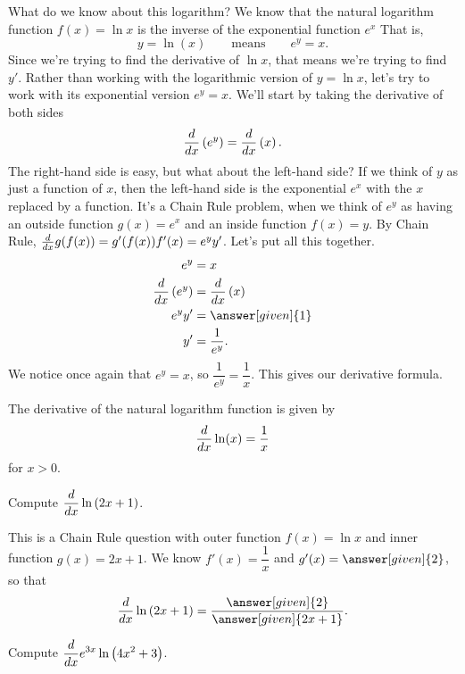 \documentclass{ximera}
\begin{document}
What do we know about this logarithm?  We know that the natural logarithm function $f(x) = \ln x$ is the inverse of the exponential function $e^x$
That is, 
  \[  y = \ln(x)\qquad\text{means}\qquad e^y = x. \]
Since we're trying to find the derivative of $\ln x$, that means we're trying to find $y'$.  Rather than working with the logarithmic version of $y = \ln x$,
let's try to work with its exponential version $e^y = x$.
We'll start by taking the derivative of both sides
\[ \frac{d}{\mathop{}\!d x} \left( e^y \right) = \frac{d}{\mathop{}\!d x} \left( x \right). \]
The right-hand side is easy, but what about the left-hand side?  If we think of $y$ as just a function of $x$, then the left-hand side is the exponential $e^x$ with the
$x$ replaced by a function.  It's a Chain Rule problem, when we think of $e^y$ as having an outside function $g(x) = e^x$ and an inside function $f(x) = y$.
By Chain Rule, $\frac{d}{\mathop{}\!d x} g(f(x)) = g'(f(x)) f'(x) = e^y y'$.  Let's put all this together.
\begin{align*}
		e^y &= x\\
	\ddx \left( e^y \right) &= \ddx \left( x \right)	\\
	e^y y' &= \answer[given]{1}\\
	y' &= \dfrac{1}{e^y}.
\end{align*}
We notice once again that $e^y = x$, so $\dfrac{1}{e^y} = \dfrac{1}{x}$.  This gives our derivative formula.
\begin{theorem}
	The derivative of the natural logarithm function is given by
	\[ \frac{d}{\mathop{}\!d x} \ln(x) = \dfrac{1}{x} \] for $x > 0$.
\end{theorem}


\begin{example}
	Compute $\displaystyle \frac{d}{\mathop{}\!d x} \ln\left(2x+1\right)$.

	\begin{explanation}
		This is a Chain Rule question with outer function $f(x) = \ln x$ and inner function $g(x) = 2x+1$.
		We know $f'(x) = \dfrac{1}{x}$ and $g'(x) = \answer[given]{2}$, so that
		\[ \ddx \ln\left( 2x+1\right) = \dfrac{\answer[given]{2}}{\answer[given]{2x+1}}. \]
	\end{explanation}
\end{example}

\begin{question}
	Compute $\displaystyle \frac{d}{\mathop{}\!d x} e^{3x} \ln\left( 4x^2+3\right)$.
	  \begin{multipleChoice}
	\end{multipleChoice}
\end{question}
\end{document}
